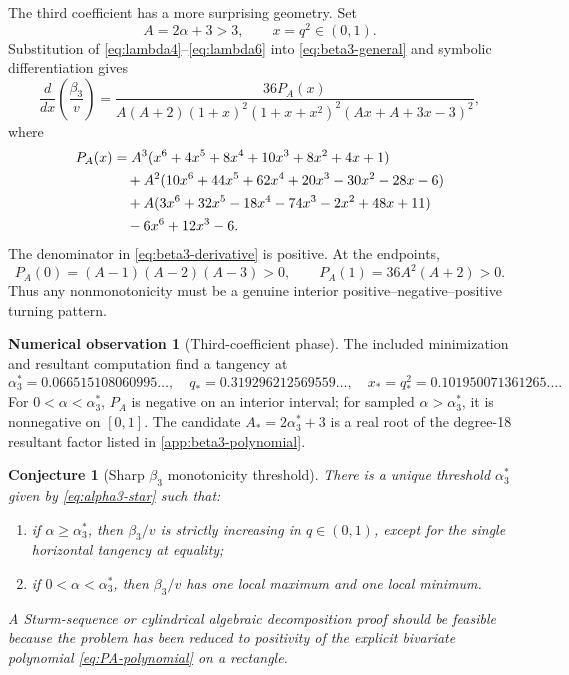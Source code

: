 \documentclass[11pt]{article}
\newtheorem{conjecture}[theorem]{Conjecture}
\theoremstyle{definition}
\newtheorem{experiment}[theorem]{Numerical observation}
\theoremstyle{remark}
\begin{document}
The third coefficient has a more surprising geometry.  Set
\begin{equation}
 A=2\alpha+3>3,
 \qquad x=q^2\in(0,1).
\end{equation}
Substitution of \eqref{eq:lambda4}--\eqref{eq:lambda6} into
\eqref{eq:beta3-general} and symbolic differentiation gives
\begin{equation}
 \frac{d}{dx}\left(\frac{\beta_3}{v}\right)
 =\frac{36P_A(x)}
 {A(A+2)(1+x)^2(1+x+x^2)^2(Ax+A+3x-3)^2},
 \label{eq:beta3-derivative}
\end{equation}
where
\begin{align}
 P_A(x)
 &=A^3(x^6+4x^5+8x^4+10x^3+8x^2+4x+1)\notag\\
 &\quad+A^2(10x^6+44x^5+62x^4+20x^3-30x^2-28x-6)\notag\\
 &\quad+A(3x^6+32x^5-18x^4-74x^3-2x^2+48x+11)\notag\\
 &\quad-6x^6+12x^3-6.
 \label{eq:PA-polynomial}
\end{align}
The denominator in \eqref{eq:beta3-derivative} is positive.  At the endpoints,
\[
 P_A(0)=(A-1)(A-2)(A-3)>0,
 \qquad P_A(1)=36A^2(A+2)>0.
\]
Thus any nonmonotonicity must be a genuine interior positive--negative--positive
turning pattern.

\begin{experiment}[Third-coefficient phase]
\label{exp:beta3-phase}
The included minimization and resultant computation find a tangency at
\begin{equation}
 \alpha_3^*=0.066515108060995\ldots,
 \quad
 q_*=0.319296212569559\ldots,
 \quad
 x_*=q_*^2=0.101950071361265\ldots.
 \label{eq:alpha3-star}
\end{equation}
For \(0<\alpha<\alpha_3^*\), \(P_A\) is negative on an interior interval;
for sampled \(\alpha>\alpha_3^*\), it is nonnegative on \([0,1]\).  The
candidate \(A_*=2\alpha_3^*+3\) is a real root of the degree-18 resultant
factor listed in \cref{app:beta3-polynomial}.
\end{experiment}

\begin{conjecture}[Sharp \(\beta_3\) monotonicity threshold]
\label{conj:beta3-threshold}
There is a unique threshold \(\alpha_3^*\) given by
\eqref{eq:alpha3-star} such that:
\begin{enumerate}[label=(\roman*)]
 \item if \(\alpha\ge\alpha_3^*\), then \(\beta_3/v\) is strictly increasing
       in \(q\in(0,1)\), except for the single horizontal tangency at equality;
 \item if \(0<\alpha<\alpha_3^*\), then \(\beta_3/v\) has one local maximum
       and one local minimum.
\end{enumerate}
A Sturm-sequence or cylindrical algebraic decomposition proof should be
feasible because the problem has been reduced to positivity of the explicit
bivariate polynomial \eqref{eq:PA-polynomial} on a rectangle.
\end{conjecture}
\end{document}

